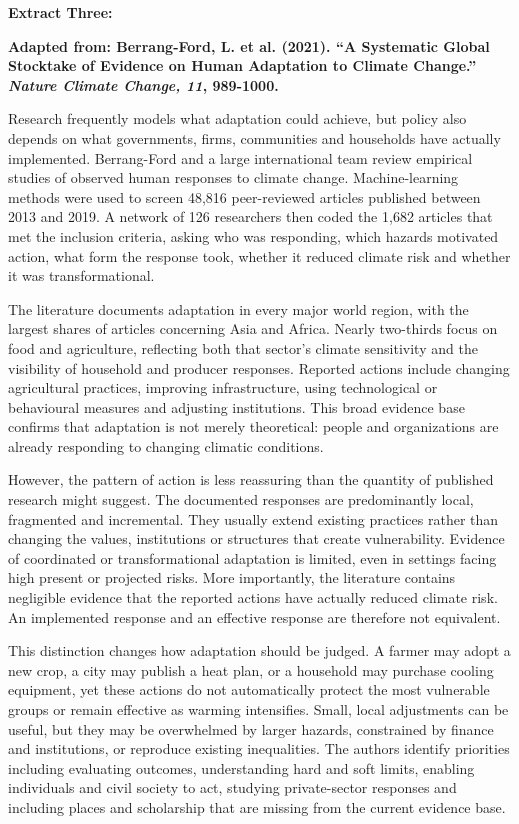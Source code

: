 \documentclass[11pt,a4paper]{article}
\newcommand{\sourceheading}[2]{%
  {\large\bfseries #1:}\par
  \vspace{5mm}
  \begin{center}
    \bfseries #2
  \end{center}
  \vspace{4mm}
}
\begin{document}
\begin{extractbox}
\sourceheading{Extract Three}{Adapted from: Berrang-Ford, L. et al. (2021). ``A Systematic Global Stocktake of Evidence on Human Adaptation to Climate Change.'' \textit{Nature Climate Change, 11}, 989-1000.}

Research frequently models what adaptation could achieve, but policy also depends on what governments, firms, communities and households have actually implemented. Berrang-Ford and a large international team review empirical studies of observed human responses to climate change. Machine-learning methods were used to screen 48,816 peer-reviewed articles published between 2013 and 2019. A network of 126 researchers then coded the 1,682 articles that met the inclusion criteria, asking who was responding, which hazards motivated action, what form the response took, whether it reduced climate risk and whether it was transformational.

The literature documents adaptation in every major world region, with the largest shares of articles concerning Asia and Africa. Nearly two-thirds focus on food and agriculture, reflecting both that sector's climate sensitivity and the visibility of household and producer responses. Reported actions include changing agricultural practices, improving infrastructure, using technological or behavioural measures and adjusting institutions. This broad evidence base confirms that adaptation is not merely theoretical: people and organizations are already responding to changing climatic conditions.

However, the pattern of action is less reassuring than the quantity of published research might suggest. The documented responses are predominantly local, fragmented and incremental. They usually extend existing practices rather than changing the values, institutions or structures that create vulnerability. Evidence of coordinated or transformational adaptation is limited, even in settings facing high present or projected risks. More importantly, the literature contains negligible evidence that the reported actions have actually reduced climate risk. An implemented response and an effective response are therefore not equivalent.

This distinction changes how adaptation should be judged. A farmer may adopt a new crop, a city may publish a heat plan, or a household may purchase cooling equipment, yet these actions do not automatically protect the most vulnerable groups or remain effective as warming intensifies. Small, local adjustments can be useful, but they may be overwhelmed by larger hazards, constrained by finance and institutions, or reproduce existing inequalities. The authors identify priorities including evaluating outcomes, understanding hard and soft limits, enabling individuals and civil society to act, studying private-sector responses and including places and scholarship that are missing from the current evidence base.


\end{extractbox}
\end{document}
